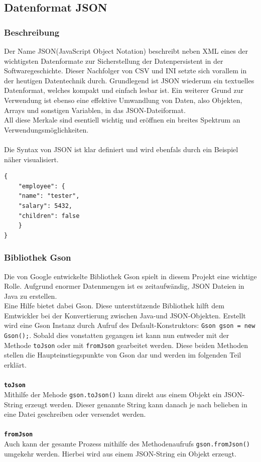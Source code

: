 \subsection{Datenformat JSON}\label{subsec:json}

\subsubsection{Beschreibung}
Der Name JSON(JavaScript Object Notation) beschreibt neben XML eines der wichtigsten Datenformate zur Sicherstellung der Datenpersistent in der Softwaregeschichte.
Dieser Nachfolger von CSV und INI setzte sich vorallem in der heutigen Datentechnik durch.
Grundlegend ist JSON wiederum ein textuelles Datenformat, welches kompakt und einfach lesbar ist.
Ein weiterer Grund zur Verwendung ist ebenso eine effektive Umwandlung von Daten, also Objekten, Arrays und sonstigen Variablen,  in das JSON-Dateiformat.\\
All diese Merkale sind esentiell wichtig und eröffnen ein breites Spektrum an Verwendungsmöglichkeiten.\\\\
Die Syntax von JSON ist klar definiert und wird ebenfals durch ein Beispiel näher visualisiert.
\begin{lstlisting}[caption=JSON-Codebeispiel,label=jsonExample]
{
    "employee": {
    "name": "tester",
    "salary": 5432,
    "children": false
    }
}
\end{lstlisting}
\subsubsection{Bibliothek Gson}
Die von Google entwickelte Bibliothek Gson spielt in diesem Projekt eine wichtige Rolle.
Aufgrund enormer Datenmengen ist es zeitaufwändig, JSON Dateien in Java zu erstellen.\\
Eine Hilfe bietet dabei Gson.
Diese unterstützende Bibliothek hilft dem Emtwickler bei der Konvertierung zwischen Java-und JSON-Objekten.
Erstellt wird eine Gson Instanz durch Aufruf des Default-Konstruktors: \lstinline{Gson gson = new Gson();}.
Sobald dies vonstatten gegangen ist kann nun entweder mit der Methode \lstinline{toJson} oder mit \lstinline{fromJson} gearbeitet werden.
Diese beiden Methoden stellen die Haupteinstiegspunkte von Gson dar und werden im folgenden Teil erklärt.
\\\\
\textbf{\lstinline{toJson}}
\\
Mithilfe der Mehode \lstinline{gson.toJson()} kann direkt aus einem Objekt ein JSON-String erzeugt werden.
Dieser genannte String kann danach je nach belieben in eine Datei geschreiben oder versendet werden.
\\\\
\textbf{\lstinline{fromJson}}
\\
Auch kann der gesamte Prozess mithilfe des Methodenaufrufs \lstinline{gson.fromJson()} umgekehr werden.
Hierbei wird aus einem JSON-String ein Objekt erzeugt.
\\
